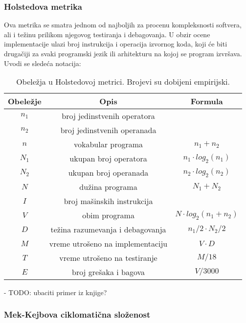 \documentclass[a4paper]{article}
\begin{document}
\subsubsection{Holstedova metrika}
\label{subsec:holsted}

Ova metrika se smatra jednom od najboljih za procenu kompleksnosti softvera, ali i težinu prilikom njegovog testiranja i debagovanja. U obzir ocene implementacije ulazi broj instrukcija i operacija izvornog koda, koji će biti drugačiji za svaki programski jezik ili arhitekturu na kojoj se program izvršava. Uvodi se sledeća notacija:\\

\begin{table}[h]
\centering
 \begin{tabular}{|c|c|c|}
  \hline
  Obeležje & Opis & Formula \\ [0ex] 
  \hline
  $n_1$ & broj jedinstvenih operatora & \\ 
  \hline
  $n_2$ & broj jedinstvenih operanada & \\ 
  \hline
  $n$ & vokabular programa & $ n_1 + n_2 $ \\ 
  \hline
  $N_1$ & ukupan broj operatora & $ n_1 \cdot log_2(n_1) $ \\ 
  \hline
  $N_2$ & ukupan broj operanada & $ n_2 \cdot log_2(n_2) $ \\ 
  \hline
  $N$ & dužina programa & $ N_1 + N_2 $ \\
  \hline
  $I$ & broj mašinskih instrukcija & \\
  \hline
  $V$ & obim programa & $ N \cdot log_2(n_1+n_2) $ \\
  \hline
  $D$ & težina razumevanja i debagovanja & $ n_1/2 \cdot N_2 / 2  $ \\
  \hline
  $M$ & vreme utrošeno na implementaciju & $ V \cdot D $ \\
  \hline
  $T$ & vreme utrošeno na testiranje & $ M / 18 $ \\
  \hline
  $E$ & broj grešaka i bagova & $ V / 3000 $ \\
  \hline
 \end{tabular}
 \caption{Obeležja u Holstedovoj metrici. Brojevi su dobijeni empirijski. \cite{ibm_halstead}}
 \label{tabela:1} 
\end{table}

- TODO:  ubaciti primer iz knjige? 

\subsubsection{Mek-Kejbova ciklomatična složenost}
\label{subsec:mekkejb}
\end{document}
